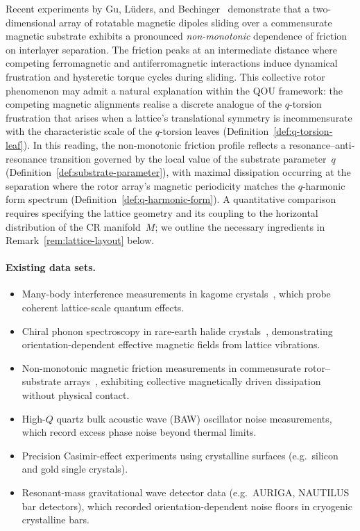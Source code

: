 \begin{remark}
\label{rem:magnetic-friction}
Recent experiments by Gu, L\"uders, and Bechinger~\cite{gu2026} demonstrate
that a two-dimensional array of rotatable magnetic dipoles sliding over a
commensurate magnetic substrate exhibits a pronounced \emph{non-monotonic}
dependence of friction on interlayer separation.  The friction peaks at an
intermediate distance where competing ferromagnetic and antiferromagnetic
interactions induce dynamical frustration and hysteretic torque cycles during
sliding.  This collective rotor phenomenon may admit a natural explanation
within the QOU framework: the competing magnetic alignments realise a discrete
analogue of the $q$-torsion frustration that arises when a lattice's
translational symmetry is incommensurate with the characteristic scale of the
$q$-torsion leaves (Definition~\ref{def:q-torsion-leaf}).  In this reading,
the non-monotonic friction profile reflects a resonance--anti-resonance
transition governed by the local value of the substrate parameter~$q$
(Definition~\ref{def:substrate-parameter}), with maximal dissipation occurring
at the separation where the rotor array's magnetic periodicity matches the
$q$-harmonic form spectrum (Definition~\ref{def:q-harmonic-form}).  A
quantitative comparison requires specifying the lattice geometry and its
coupling to the horizontal distribution of the CR manifold~$M$; we outline
the necessary ingredients in Remark~\ref{rem:lattice-layout} below.
\end{remark}

\paragraph{Existing data sets.}
\begin{itemize}
  \item Many-body interference measurements in kagome
        crystals~\cite{guo2025}, which probe coherent lattice-scale quantum
        effects.
  \item Chiral phonon spectroscopy in rare-earth halide
        crystals~\cite{luo2023}, demonstrating orientation-dependent
        effective magnetic fields from lattice vibrations.
  \item Non-monotonic magnetic friction measurements in commensurate
        rotor--substrate arrays~\cite{gu2026}, exhibiting collective
        magnetically driven dissipation without physical contact.
  \item High-$Q$ quartz bulk acoustic wave (BAW) oscillator noise
        measurements, which record excess phase noise beyond thermal limits.
  \item Precision Casimir-effect experiments using crystalline surfaces
        (e.g.\ silicon and gold single crystals).
  \item Resonant-mass gravitational wave detector data (e.g.\ AURIGA,
        NAUTILUS bar detectors), which recorded orientation-dependent noise
        floors in cryogenic crystalline bars.
\end{itemize}

